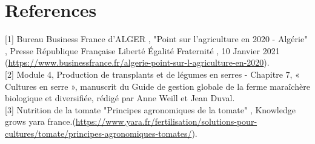 \chapter*{References} 
\label{chap:reference} 
[1] Bureau Business France d'ALGER , "Point sur l'agriculture en 2020 - Algérie" , Presse République Française Liberté Égalité Fraternité , 10 Janvier 2021 (\url {https://www.businessfrance.fr/algerie-point-sur-l-agriculture-en-2020}).
\\



    [2] Module 4, Production de transplants et de légumes en serres - Chapitre 7, « Cultures en serre », manuscrit du Guide de gestion globale de la ferme maraîchère biologique et diversifiée, rédigé par Anne Weill et Jean Duval.
    \\ 

  [3] Nutrition de la tomate "Principes agronomiques de la tomate" , Knowledge grows yara france.(\url {https://www.yara.fr/fertilisation/solutions-pour-cultures/tomate/principes-agronomiques-tomates/}).


